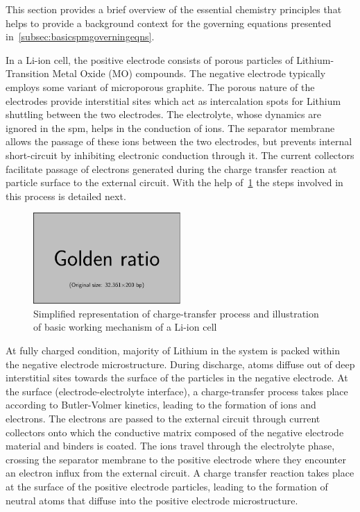 This section  provides a  brief overview of  the essential  chemistry principles
that helps to provide a background context for the governing equations presented
in~\cref{subsec:basicspmgoverningeqns}.


In  a Li-ion  cell,  the  positive electrode  consists  of  porous particles  of
Lithium-Transition Metal Oxide (MO)  compounds. The negative electrode typically
employs  some  variant  of  microporous  graphite.  The  porous  nature  of  the
electrodes  provide interstitial  sites  which act  as  intercalation spots  for
Lithium shuttling  between the two  electrodes. The electrolyte,  whose dynamics
are ignored  in the \gls{spm},  helps in the  conduction of   ions. The
separator membrane allows the passage of  these ions between the two electrodes,
but prevents internal short-circuit  by inhibiting electronic conduction through
it. The current collectors facilitate  passage of electrons generated during the
charge transfer reaction  at particle surface to the external  circuit. With the
help of~\cref{fig:chargetransferprocess}  the steps involved in  this process is
detailed next.

\begin{figure}[h]
    \centering
    \includegraphics[width=0.5\textwidth]{placeholder_images/example-image-golden.pdf}
    \caption{Simplified representation of charge-transfer process and illustration of
    basic working mechanism of a Li-ion cell}
    \label{fig:chargetransferprocess}
\end{figure}

At fully charged  condition, majority of Lithium in the  system is packed within
the negative electrode microstructure. During discharge,  atoms diffuse
out  of  deep  interstitial  sites  towards the  surface  of  the  particles  in
the  negative electrode.  At  the surface  (electrode-electrolyte interface),  a
charge-transfer process takes place according to Butler-Volmer kinetics, leading
to  the formation  of   ions and  electrons. The  electrons are  passed
to  the external  circuit  through   current  collectors  onto which  the
conductive matrix  composed of  the negative electrode  material and  binders is
coated. The   ions travel  through the electrolyte phase,  crossing the
separator membrane  to the positive  electrode where they encounter  an electron
influx from the external circuit. A  charge transfer reaction takes place at the
surface of the positive electrode particles, leading to the formation of neutral
 atoms that diffuse into the positive electrode microstructure.

